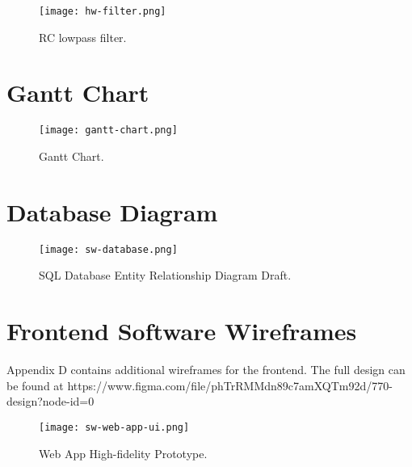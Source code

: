 \begin{figure}[!ht]
	\centering
	\texttt{[image: hw-filter.png]}
	\caption{RC lowpass filter.}
	\label{fig:filter}
\end{figure}

\chapter{Gantt Chart}

\begin{figure}[!ht]
	\centering
	\texttt{[image: gantt-chart.png]}
	\caption{Gantt Chart.}
	\label{fig:gantt-chart-1}
\end{figure}

\chapter{Database Diagram}

\begin{figure}[!ht]
	\centering
	\texttt{[image: sw-database.png]}
	\caption{SQL Database Entity Relationship Diagram Draft.}
	\label{fig:database-1}
\end{figure}

\chapter{Frontend Software Wireframes}

Appendix D contains additional wireframes for the frontend. The full design can be found at https://www.figma.com/file/phTrRMMdn89c7amXQTm92d/770-design?node-id=0%

\begin{figure}[!ht]
	\centering
	\texttt{[image: sw-web-app-ui.png]}
	\caption{Web App High-fidelity Prototype.}
	\label{fig:webapp-1}
\end{figure}



